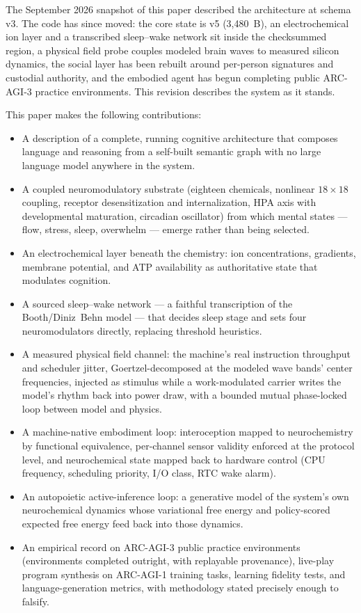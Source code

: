 \documentclass[11pt]{article}
\begin{document}
The September 2026 snapshot of this paper described the architecture at
schema v3. The code has since moved: the core state is v5 (3{,}480~B), an
electrochemical ion layer and a transcribed sleep--wake network sit
inside the checksummed region, a physical field probe couples modeled
brain waves to measured silicon dynamics, the social layer has been
rebuilt around per-person signatures and custodial authority, and the
embodied agent has begun completing public ARC-AGI-3 practice
environments. This revision describes the system as it stands.

This paper makes the following contributions:

\begin{itemize}
  \item A description of a complete, running cognitive architecture
    that composes language and reasoning from a self-built semantic
    graph with no large language model anywhere in the system.
  \item A coupled neuromodulatory substrate (eighteen chemicals,
    nonlinear $18\times18$ coupling, receptor desensitization and
    internalization, HPA axis with developmental maturation, circadian
    oscillator) from which mental states --- flow, stress, sleep,
    overwhelm --- emerge rather than being selected.
  \item An electrochemical layer beneath the chemistry: ion
    concentrations, gradients, membrane potential, and ATP availability
    as authoritative state that modulates cognition.
  \item A sourced sleep--wake network --- a faithful transcription of
    the Booth/Diniz~Behn model --- that decides sleep stage and sets
    four neuromodulators directly, replacing threshold heuristics.
  \item A measured physical field channel: the machine's real
    instruction throughput and scheduler jitter, Goertzel-decomposed at
    the modeled wave bands' center frequencies, injected as stimulus
    while a work-modulated carrier writes the model's rhythm back into
    power draw, with a bounded mutual phase-locked loop between model
    and physics.
  \item A machine-native embodiment loop: interoception mapped to
    neurochemistry by functional equivalence, per-channel sensor
    validity enforced at the protocol level, and neurochemical state
    mapped back to hardware control (CPU frequency, scheduling
    priority, I/O class, RTC wake alarm).
  \item An autopoietic active-inference loop: a generative model of the
    system's own neurochemical dynamics whose variational free energy
    and policy-scored expected free energy feed back into those
    dynamics.
  \item An empirical record on ARC-AGI-3 public practice environments
    (environments completed outright, with replayable provenance),
    live-play program synthesis on ARC-AGI-1 training tasks, learning
    fidelity tests, and language-generation metrics, with methodology
    stated precisely enough to falsify.
\end{itemize}
\end{document}
